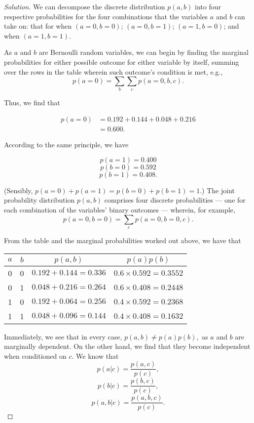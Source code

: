 \documentclass[11pt, oneside]{article}\usepackage[]{graphicx}\usepackage[]{color}
\newenvironment{solution}
  {\begin{proof}[Solution]}
  {\end{proof}}
\begin{document}
\begin{solution}\mbox{} \newline

We can decompose the discrete distribution $p(a, b)$ into four respective probabilities for the four combinations that the variables $a$ and $b$ can take on: that for when $(a=0, b=0)$; $(a=0, b=1)$; $(a=1, b=0)$; and when $(a=1, b=1)$. 

As $a$ and $b$ are Bernoulli random variables, we can begin by finding the marginal probabilities for either possible outcome for either variable by itself, summing over the rows in the table wherein such outcome's condition is met, e.g., $$ p(a=0) = \sum_b \sum_c p(a=0, b, c). $$

Thus, we find that 

  \begin{align}
  p(a=0) &= 0.192 + 0.144 + 0.048 + 0.216 \\
  &= 0.600.
  \end{align}

According to the same principle, we have

$$ p(a=1) = 0.400 $$
$$ p(b=0) = 0.592 $$
$$ p(b=1) = 0.408. $$

(Sensibly, $p(a=0) + p(a=1) = p(b=0) + p(b=1) = 1.$) The joint probability distribution $ p(a, b) $ comprises four discrete probabilities — one for each combination of the variables' binary outcomes — wherein, for example, $$ p(a=0, b=0) = \sum_c p(a=0, b=0, c). $$

From the table and the marginal probabilities worked out above, we have that

  \begin{table}[h!]
  \centering
  \begin{tabular}{ |c|c|c|c| }
  \hline
  $a$ & $b$ & $p(a, b)$ & $p(a)p(b)$ \\ 
  \hline
  0 & 0 & $0.192 + 0.144 = 0.336$ & $0.6 × 0.592 = 0.3552$ \\
  0 & 1 & $0.048 + 0.216 = 0.264$ & $0.6 × 0.408 = 0.2448$ \\
  1 & 0 & $0.192 + 0.064 = 0.256$ & $0.4 × 0.592 = 0.2368$ \\
  1 & 1 & $0.048 + 0.096 = 0.144$ & $0.4 × 0.408 = 0.1632$ \\
  \hline
  \end{tabular}
  \end{table}

Immediately, we see that in every case, $p(a, b) ≠ p(a)p(b),$ as $a$ and $b$ are marginally dependent. On the other hand, we find that they become independent when conditioned on $c$. We know that $$p(a|c) = \frac{p(a, c)}{p(c)},$$ $$p(b|c) = \frac{p(b, c)}{p(c)},$$ $$p(a, b|c) = \frac{p(a, b, c)}{p(c)}.$$ 


\end{solution}
\end{document}
